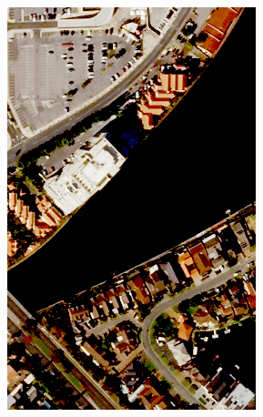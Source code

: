\documentclass[10pt,journal]{IEEEtran}  %
\begin{document}
\begin{figure}[h!]
\centering
\begin{subfigure}{0.31\linewidth}
\centering
\includegraphics[width = \textwidth]{figures/pb_bad_dr_low.png}
\end{subfigure}
\begin{subfigure}{0.31\linewidth}
\centering

\end{subfigure}
\end{figure}
\end{document}
